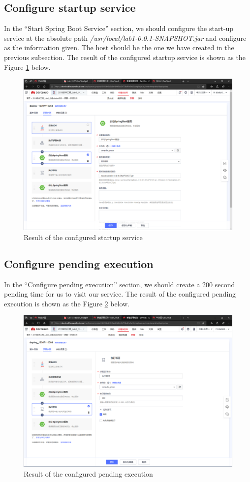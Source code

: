 \documentclass[a4paper]{report}
\begin{document}
\subsection{Configure startup service}
In the ``Start Spring Boot Service'' section, we should configure the start-up service at the absolute path \emph{/usr/local/lab1-0.0.1-SNAPSHOT.jar} and configure as the information given. The host should be the one we have created in the previous subsection. The result of the configured startup service is shown as the Figure \ref{10} below.
\begin{figure}
  \centering
  \includegraphics[width=12cm]{Figures/Capture7.png}
  \caption{Result of the configured startup service}\label{10}
\end{figure}
\subsection{Configure pending execution}
In the ``Configure pending execution'' section, we should create a 200 second pending time for us to visit our service. The result of the configured pending execution is shown as the Figure \ref{11} below.
\begin{figure}
  \centering
  \includegraphics[width=12cm]{Figures/Capture8.png}
  \caption{Result of the configured pending execution}\label{11}
\end{figure}
\end{document}
